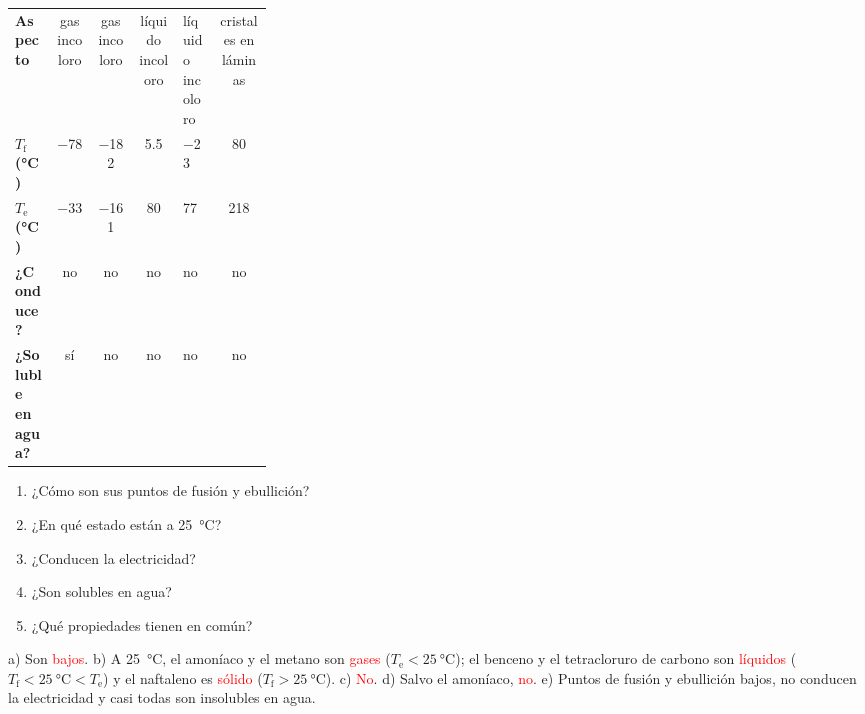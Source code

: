 \begin{exercise}
\begin{center}
{\begin{tabular}{@{}L{0.16\linewidth} c c c C{0.14\linewidth} c@{}}
            \midrule
            \textbf{Aspecto} & gas incoloro & gas incoloro & líquido incoloro & líquido incoloro & cristales en láminas \\[3pt]
            \textbf{\(T_\text{f}\) (\unit{\celsius})} & \num{-78} & \num{-182} & \num{5.5} & \num{-23} & \num{80} \\[3pt]
            \textbf{\(T_\text{e}\) (\unit{\celsius})} & \num{-33} & \num{-161} & \num{80} & \num{77} & \num{218} \\[3pt]
            \textbf{¿Conduce?} & no & no & no & no & no \\[3pt]
            \textbf{¿Soluble en agua?} & sí & no & no & no & no \\
            \bottomrule
        \end{tabular}
        }
    \end{center}
    \begin{enumerate}[label=\alph*)]
        \item ¿Cómo son sus puntos de fusión y ebullición?
        \item ¿En qué estado están a \qty{25}{\celsius}?
        \item ¿Conducen la electricidad?
        \item ¿Son solubles en agua?
        \item ¿Qué propiedades tienen en común?
    \end{enumerate}
    \begin{solu}
        a) Son \textcolor{red}{bajos}. b) A \qty{25}{\celsius}, el amoníaco y el metano son \textcolor{red}{gases} (\(T_\text{e} < \qty{25}{\celsius}\)); el benceno y el tetracloruro de carbono son \textcolor{red}{líquidos} (\(T_\text{f} < \qty{25}{\celsius} < T_\text{e}\)) y el naftaleno es \textcolor{red}{sólido} (\(T_\text{f} > \qty{25}{\celsius}\)). c) \textcolor{red}{No}. d) Salvo el amoníaco, \textcolor{red}{no}. e) Puntos de fusión y ebullición bajos, no conducen la electricidad y casi todas son insolubles en agua.
    \end{solu}
\end{exercise}

